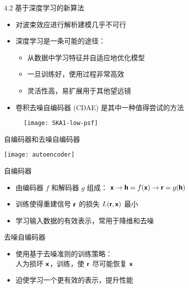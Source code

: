 \documentclass{beamer}
\begin{document}
\begin{frame}{4.2 基于深度学习的新算法}
  \begin{itemize}
    \item 对波束效应进行解析建模几乎不可行
    \item \alert{深度学习}是一条可能的途径：
      \begin{itemize}
        \item 从数据中学习特征并自适应地优化模型
        \item 一旦训练好，使用过程非常高效
        \item 灵活性高，易扩展用于其他望远镜
      \end{itemize}
    \item \alert{卷积去噪自编码器 (CDAE)} 是其中一种值得尝试的方法
  \end{itemize}
  \vspace{-1ex}
  \begin{figure}
    \centering
    \texttt{[image: SKA1-low-psf]}
  \end{figure}
\end{frame}

\begin{frame}[t]
  \begin{alertblock}{自编码器和去噪自编码器}
  \end{alertblock}
  \begin{center}
    \texttt{[image: autoencoder]}
  \end{center}
  \vspace{-1ex}
  \begin{alertblock}{自编码器}
    \vspace{-1ex}
    \begin{itemize}
      \item 由编码器 $f$ 和解码器 $g$ 组成：
        $\bm{\mathsf{x}} \rightarrow \bm{\mathsf{h}} = f(\bm{\mathsf{x}}) \rightarrow \bm{\mathsf{r}} = g(\bm{\mathsf{h}})$
      \item 训练使得重建信号 $\bm{\mathsf{r}}$ 的损失 $L(\bm{\mathsf{r}}, \bm{\mathsf{x}})$ 最小
      \item 学习输入数据的有效表示，常用于降维和去噪
    \end{itemize}
  \end{alertblock}
  \begin{alertblock}{去噪自编码器}
    \vspace{-1ex}
    \begin{itemize}
      \item 使用基于\alert{去噪准则}的训练策略：\\
        人为损坏 $\bm{\mathsf{x}}$，训练，使 $\bm{\mathsf{r}}$ 尽可能恢复 $\bm{\mathsf{x}}$
      \item 迫使学习一个更有效的表示，提升性能
    \end{itemize}
  \end{alertblock}
\end{frame}
\end{document}

